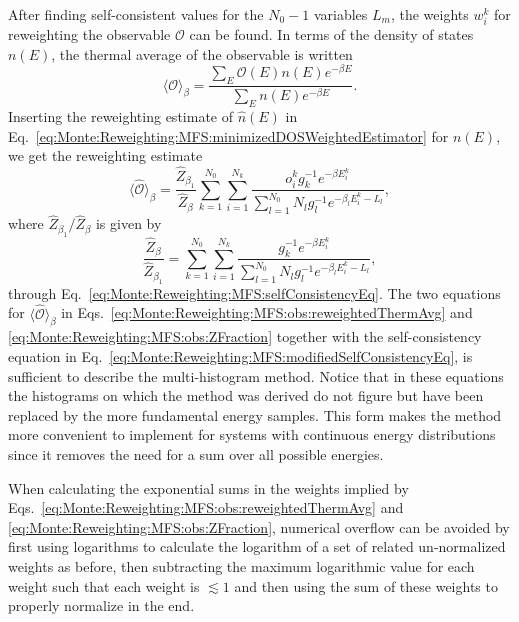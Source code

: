 After finding self-consistent values for the $N_0-1$ variables $L_m$, the weights $w_i^k$ for reweighting the observable $\mathcal{O}$ can be found. In terms of the
density of states $n(E)$, the thermal average of the observable is written
\begin{equation}
    \label{eq:Monte:Reweighting:MFS:obs:thermAvg}
    \langle\mathcal{O}\rangle_\beta = \frac{\sum_E\mathcal{O}(E)n(E)e^{-\beta E}}{\sum_En(E)e^{-\beta E}}.
\end{equation}
Inserting the reweighting estimate of $\hat{n}(E)$ in Eq.~\eqref{eq:Monte:Reweighting:MFS:minimizedDOSWeightedEstimator} for $n(E)$, we get the reweighting estimate
\begin{equation}
    \label{eq:Monte:Reweighting:MFS:obs:reweightedThermAvg}
    \langle\hat{\mathcal{O}}\rangle_\beta = \frac{\hat{Z}_{\beta_1}}{\hat{Z}_\beta}\sum_{k=1}^{N_0}\sum_{i=1}^{N_k}\frac{o_i^kg_k^{-1}e^{-\beta E_i^k}}{\sum_{l=1}^{N_0}N_lg_l^{-1}e^{-\beta_lE_i^k-L_l}},
\end{equation}
where $\hat{Z}_{\beta_1}/\hat{Z}_\beta$ is given by
\begin{equation}
    \label{eq:Monte:Reweighting:MFS:obs:ZFraction}
    \frac{\hat{Z}_\beta}{\hat{Z}_{\beta_1}} = \sum_{k=1}^{N_0}\sum_{i=1}^{N_k}\frac{g_k^{-1}e^{-\beta E_i^k}}{\sum_{l=1}^{N_0}N_lg_l^{-1}e^{-\beta_lE_i^k - L_l}},
\end{equation}
through Eq.~\eqref{eq:Monte:Reweighting:MFS:selfConsistencyEq}. The two equations for $\langle\hat{\mathcal{O}}\rangle_\beta$ in
Eqs.~\eqref{eq:Monte:Reweighting:MFS:obs:reweightedThermAvg} and \eqref{eq:Monte:Reweighting:MFS:obs:ZFraction} together with the self-consistency equation in
Eq.~\eqref{eq:Monte:Reweighting:MFS:modifiedSelfConsistencyEq}, is sufficient to describe the multi-histogram method. Notice that in these equations the
histograms on which the method was derived do not figure but have been replaced by the more fundamental energy samples. This form makes the method more convenient
to implement for systems with continuous energy distributions since it removes the need for a sum over all possible energies.

When calculating the exponential sums in the weights implied by
Eqs.~\eqref{eq:Monte:Reweighting:MFS:obs:reweightedThermAvg} and \eqref{eq:Monte:Reweighting:MFS:obs:ZFraction}, numerical overflow can be avoided by first using
logarithms to calculate the logarithm of a set of related un-normalized weights as before, then subtracting the maximum logarithmic value for each weight such that
each weight is $\lesssim1$ and then using the sum of these weights to properly normalize in the end.

